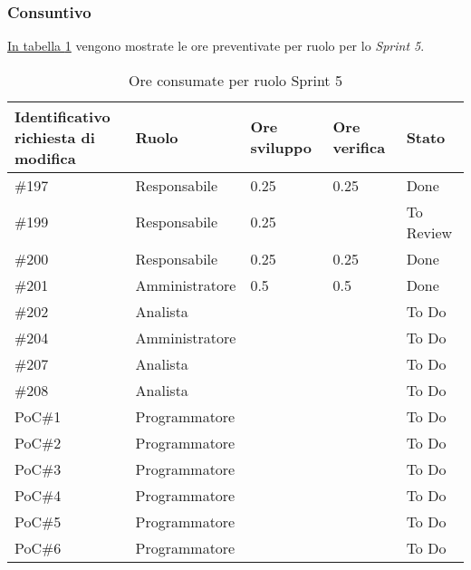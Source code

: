 \subsubsection{Consuntivo}
\label{sec:sprint5_consuntivo}
\hyperref[tab:sprint5_ore_consumate]{In tabella \ref{tab:sprint5_ore_consumate}} vengono mostrate le ore preventivate per ruolo per lo \textit{Sprint 5}.

\begin{table}[H]
    \centering
    \begin{tabular}{| l | l | l | l | l |}
        \hline
            \makecell{\textbf{Identificativo} \\ \textbf{richiesta di modifica}} &
            \textbf{Ruolo} & 
            \textbf{Ore sviluppo} &
            \textbf{Ore verifica} & 
            \textbf{Stato}\\ 
        \hline        
        \#197 & Responsabile & 0.25 & 0.25 & Done\\
        \hline
        \#199 & Responsabile & 0.25 & & To Review\\
        \hline
        \#200 & Responsabile & 0.25 & 0.25 & Done\\
        \hline
        \#201 & Amministratore & 0.5 & 0.5 & Done\\
        \hline
        \#202 & Analista &  &  & To Do\\
        \hline
        \#204 & Amministratore & & & To Do\\
        \hline
        \#207 & Analista &  &  & To Do\\
        \hline
        \#208 & Analista &  &  & To Do\\
        \hline
        PoC\#1 & Programmatore & & & To Do\\
        \hline
        PoC\#2 & Programmatore & & & To Do\\
        \hline
        PoC\#3 & Programmatore & & & To Do\\
        \hline
        PoC\#4 & Programmatore & & & To Do\\
        \hline
        PoC\#5 & Programmatore & & & To Do\\
        \hline
        PoC\#6 & Programmatore & & & To Do\\
        \hline
    \end{tabular}
    \caption{Ore consumate per ruolo Sprint 5}
    \label{tab:sprint5_ore_consumate} 
\end{table}